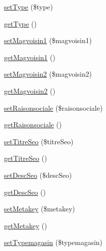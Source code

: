 \begin{DoxyCompactItemize}
\item 
\hyperlink{class_acme_group_1_1_labo_bundle_1_1_entity_1_1magasin_a07c55dc72e99038dc565a70102a03a41}{set\+Type} (\$type)
\item 
\hyperlink{class_acme_group_1_1_labo_bundle_1_1_entity_1_1magasin_a4d99c36f27074c60d1fdbcf0f8717256}{get\+Type} ()
\item 
\hyperlink{class_acme_group_1_1_labo_bundle_1_1_entity_1_1magasin_acebb030e9ee36a2d65e7b34e79dd765a}{set\+Magvoisin1} (\$magvoisin1)
\item 
\hyperlink{class_acme_group_1_1_labo_bundle_1_1_entity_1_1magasin_a0fe0092a63dadcce707fb1cdd2043dbe}{get\+Magvoisin1} ()
\item 
\hyperlink{class_acme_group_1_1_labo_bundle_1_1_entity_1_1magasin_a6ce694e0ba68920b3b1ddfb0f5a91e35}{set\+Magvoisin2} (\$magvoisin2)
\item 
\hyperlink{class_acme_group_1_1_labo_bundle_1_1_entity_1_1magasin_afe03fc9e294baf02450de7b81dd96f47}{get\+Magvoisin2} ()
\item 
\hyperlink{class_acme_group_1_1_labo_bundle_1_1_entity_1_1magasin_a93b7184f4427a3baa44524e8827e0e2e}{set\+Raisonsociale} (\$raisonsociale)
\item 
\hyperlink{class_acme_group_1_1_labo_bundle_1_1_entity_1_1magasin_a841ad2cc42794b61b7722cf395d7bb42}{get\+Raisonsociale} ()
\item 
\hyperlink{class_acme_group_1_1_labo_bundle_1_1_entity_1_1magasin_ab163acef82acf922a0351fd286080762}{set\+Titre\+Seo} (\$titre\+Seo)
\item 
\hyperlink{class_acme_group_1_1_labo_bundle_1_1_entity_1_1magasin_a0df2cb360b5484d59ead9acce340b65c}{get\+Titre\+Seo} ()
\item 
\hyperlink{class_acme_group_1_1_labo_bundle_1_1_entity_1_1magasin_a8903bd0b928011b24c740222aec732b3}{set\+Desc\+Seo} (\$desc\+Seo)
\item 
\hyperlink{class_acme_group_1_1_labo_bundle_1_1_entity_1_1magasin_ad1bc44425f64985b21725bf7d6be9aeb}{get\+Desc\+Seo} ()
\item 
\hyperlink{class_acme_group_1_1_labo_bundle_1_1_entity_1_1magasin_a8d972b1b764a97416dd7a89979b1f42d}{set\+Metakey} (\$metakey)
\item 
\hyperlink{class_acme_group_1_1_labo_bundle_1_1_entity_1_1magasin_ae14b4537c86211a65dbbd9bf3f18c8b6}{get\+Metakey} ()
\item 
\hyperlink{class_acme_group_1_1_labo_bundle_1_1_entity_1_1magasin_a612a5a596662e93427329ba56a1a158f}{set\+Typemagasin} (\$typemagasin)
\item 

\end{DoxyCompactItemize}
